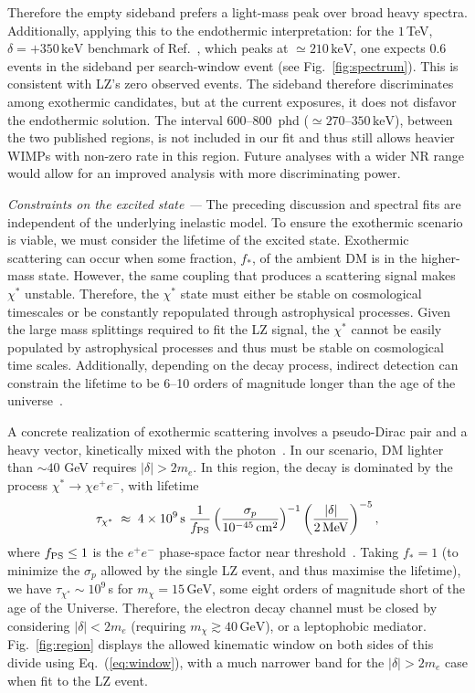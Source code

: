 \documentclass[aps,prl,twocolumn,superscriptaddress,nofootinbib,floatfix,longbibliography]{revtex4-2}
\newcommand{\keV}{\ensuremath{\,\mathrm{keV}}}
\newcommand{\MeV}{\ensuremath{\,\mathrm{MeV}}}
\newcommand{\GeV}{\ensuremath{\,\mathrm{GeV}}}
\newcommand{\cms}{\ensuremath{\,\mathrm{cm^2}}}
\newcommand{\mchi}{\ensuremath{m_\chi}}
\begin{document}
Therefore the empty sideband prefers a light-mass peak over broad heavy spectra. Additionally, applying this to the endothermic interpretation: for the $1\,$TeV, $\delta = +350\keV$ benchmark of Ref.~\cite{Freese:2026sga}, which peaks at $\simeq210\keV$, one expects $0.6$ events in the sideband per search-window event (see Fig.~\ref{fig:spectrum}). This is consistent with LZ's zero observed events. The sideband therefore discriminates among exothermic candidates, but at the current exposures, it does not disfavor the endothermic solution. The interval $600$--$800$~phd ($\simeq270$--$350\keV$), between the two published regions, is not included in our fit and thus still allows heavier WIMPs with non-zero rate in this region. Future analyses with a wider NR range would allow for an improved analysis with more discriminating power.

\emph{Constraints on the excited state ---} The preceding discussion and spectral fits are independent of the underlying inelastic model. To ensure the exothermic scenario is viable, we must consider the lifetime of the excited state. Exothermic scattering can occur when some fraction, $f_*$, of the ambient DM is in the higher-mass state. However, the same coupling that produces a scattering signal makes $\chi^*$ unstable. Therefore, the $\chi^*$  state must either be stable on cosmological timescales or be constantly repopulated through astrophysical processes.  Given the large mass splittings required to fit the LZ signal, the $\chi^*$ cannot be easily populated by astrophysical processes and thus must be stable on cosmological time scales. Additionally, depending on the decay process, indirect detection can constrain the lifetime to be 6--10 orders of magnitude longer than the age of the universe~\cite{Essig:2013goa}.

A concrete realization of exothermic scattering involves a pseudo-Dirac pair and a heavy vector, kinetically mixed with the photon~\cite{Batell:2009vb,Finkbeiner:2009mi}. In our scenario, DM lighter than $\sim40$ GeV requires $|\delta| > 2m_e$. In this region, the decay is dominated by the process $\chi^{*}\to\chi e^+e^-$, with lifetime
%
\begin{equation}
  \tau_{\chi^{*}} \;\approx\; 4\times10^{9}\,\mathrm{s}\;
  \frac{1}{f_{\rm PS}}
  \left(\frac{\sigma_p}{10^{-45}\cms}\right)^{-1}
  \left(\frac{|\delta|}{2\MeV}\right)^{-5} ,
  \label{eq:lifetime}
\end{equation}
%
where $f_{\rm PS} \le 1$ is the $e^+e^-$ phase-space factor near threshold~\cite{Fitzpatrick:2021cij,CarrilloGonzalez:2021lxm}.  Taking $f_* = 1$ (to minimize the $\sigma_p$ allowed by the single LZ event, and thus maximise the lifetime), we have $\tau_{\chi^*} \sim 10^{9}\,$s for $\mchi = 15\GeV$, some eight orders of magnitude short of the age of the Universe. Therefore, the electron decay channel must be closed by considering $|\delta| < 2m_e$ (requiring $\mchi \gtrsim 40\GeV$), or a leptophobic mediator. Fig.~\ref{fig:region} displays the allowed kinematic window on both sides of this divide using Eq.~(\ref{eq:window}), with a much narrower band for the $|\delta| > 2m_e$ case when fit to the LZ event.
\end{document}
